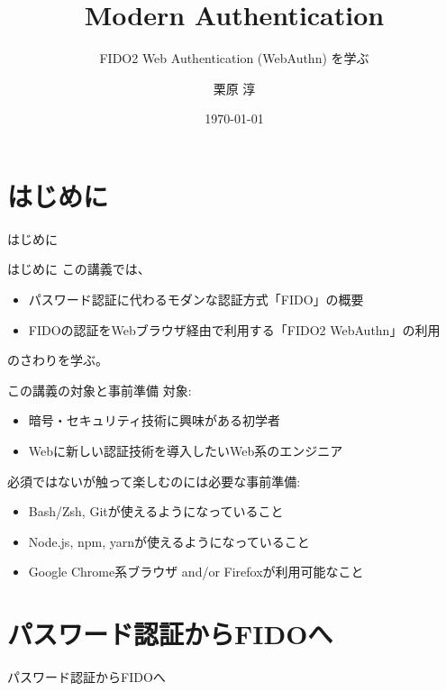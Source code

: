 \documentclass[12pt,dvipdfmx,uplatex]{beamer}
\title[Modern Authentication]{Modern Authentication}
\subtitle{FIDO2 Web Authentication (WebAuthn) を学ぶ}
\author[Jun Kurihara]{栗原 淳}
\institute[U-Hyogo/Zettant]{兵庫県立大学 大学院応用情報科学研究科 \\ 株式会社ゼタント}
\date[\today]{\today}
\begin{document}
\begin{frame}
\titlepage
\end{frame}

\section{はじめに}
\begin{frame}
 \centering
 {\Large はじめに}
\end{frame}

\begin{frame}{はじめに}
この講義では、
\begin{itemize}
 \item パスワード認証に代わるモダンな認証方式「FIDO」の概要
 \item FIDOの認証をWebブラウザ経由で利用する「FIDO2 WebAuthn」の利用
\end{itemize}
のさわりを学ぶ。
\end{frame}

\begin{frame}{この講義の対象と事前準備}
対象:
\begin{itemize}
\item 暗号・セキュリティ技術に興味がある初学者
\item Webに新しい認証技術を導入したいWeb系のエンジニア
\end{itemize}

\vspace{2ex}

必須ではないが触って楽しむのには必要な事前準備:
\begin{itemize}
\item Bash/Zsh, Gitが使えるようになっていること
\item Node.js, npm, yarnが使えるようになっていること
\item Google Chrome系ブラウザ and/or Firefoxが利用可能なこと
\end{itemize}
\end{frame}



\section{パスワード認証からFIDOへ}
\begin{frame}
\centering
{\Large パスワード認証からFIDOへ}
\end{frame}
\end{document}
